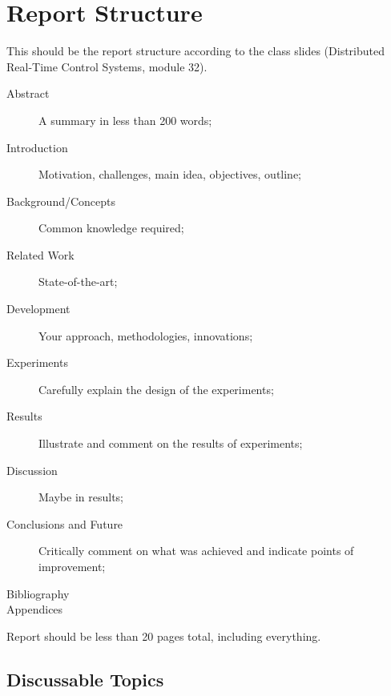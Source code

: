 \documentclass[english,fira]{ist-report}
\begin{document}
\pagebreak

\appendix
\nocite{consensusbernardino}
\printbibliography[heading = bibnumbered]


\section{Report Structure}

This should be the report structure according to the class slides (Distributed Real-Time Control Systems, module 32).
\begin{description}
	\item[Abstract] A summary in less than 200 words;
	\item[Introduction] Motivation, challenges, main idea, objectives, outline;
	\item[Background/Concepts] Common knowledge required;
	\item[Related Work] State-of-the-art;
	\item[Development] Your approach, methodologies, innovations;
	\item[Experiments] Carefully explain the design of the experiments;
	\item[Results] Illustrate and comment on the results of experiments;
	\item[Discussion] Maybe in results;
	\item[Conclusions and Future] Critically comment on what was achieved and indicate points of improvement;
	\item[Bibliography]
	\item[Appendices]
\end{description}

Report should be less than 20 pages total, including everything.

\subsection{Discussable Topics}
\end{document}
